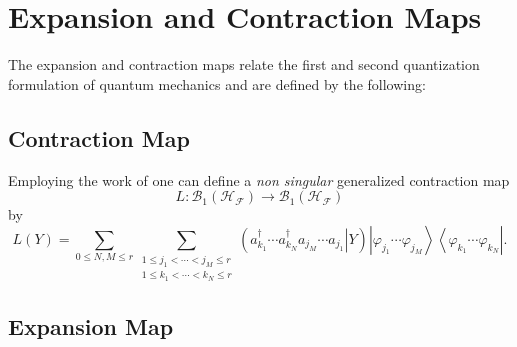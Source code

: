 \documentclass[aps,preprint]{revtex4}%
\begin{document}
\section{Expansion and Contraction Maps \label{Expansion and Contraction}}

The expansion and contraction maps relate the first and second quantization
formulation of quantum mechanics and are defined by the following:

\subsection{Contraction Map \label{Contraction}}

Employing the work of \cite{Kummar70} one can define a \emph{non singular
}generalized contraction map
\begin{equation}
L:\mathcal{B}_{1}\left(  \mathcal{H}_{\mathcal{F}}\right)  \rightarrow
\mathcal{B}_{1}\left(  \mathcal{H}_{\mathcal{F}}\right)
\end{equation}
by
\begin{equation}
L\left(  Y\right)  =\sum_{0\leq N,M\leq r}\sum_{\substack{1\leq j_{1}%
<\cdots<j_{M}\leq r\\1\leq k_{1}<\cdots<k_{N}\leq r}}\left(  \left.  a_{k_{1}%
}^{\dagger}\cdots a_{k_{N}}^{\dagger}a_{j_{M}}\cdots a_{j_{1}}\right\vert
Y\right)  \left\vert \varphi_{j_{1}}\cdots\varphi_{j_{M}}\right\rangle
\left\langle \varphi_{k_{1}}\cdots\varphi_{k_{N}}\right\vert . \label{CONT}%
\end{equation}


\subsection{Expansion Map \label{Expansion}}
\end{document}

